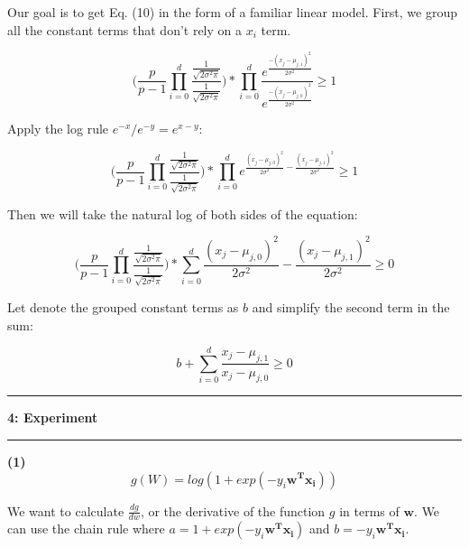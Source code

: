 \documentclass[11pt]{article}
\newcommand\question[2]{\vspace{.25in}\hrule\textbf{#1: #2}\vspace{.5em}\hrule\vspace{.10in}}
\renewcommand\part[1]{\vspace{.10in}\textbf{(#1)}}
\begin{document}
Our goal is to get Eq. (10) in the form of a familiar linear model. First, we group all the constant terms that don't rely on a $x_i$ term.

\begin{equation}
\Bigg( \frac{p}{p-1}\prod_{i = 0}^d \frac{\frac{1}{\sqrt{2\sigma^2\pi}}}{\frac{1}{\sqrt{2\sigma^2\pi}}} \Bigg) * \prod_{i = 0}^d \frac{e^{\frac{-(x_j-\mu_{j,1})^2}{2\sigma^2}}}{e^{\frac{-(x_j-\mu_{j,0})^2}{2\sigma^2}}} \geq 1
\end{equation}

Apply the log rule $e^{-x}/e^{-y} = e^{x-y}$:

\begin{equation}
\Bigg( \frac{p}{p-1}\prod_{i = 0}^d \frac{\frac{1}{\sqrt{2\sigma^2\pi}}}{\frac{1}{\sqrt{2\sigma^2\pi}}} \Bigg) * \prod_{i = 0}^d e^{\frac{(x_j-\mu_{j,0})^2}{2\sigma^2} - \frac{(x_j-\mu_{j,1})^2}{2\sigma^2}} \geq 1
\end{equation}

Then we will take the natural log of both sides of the equation:


\begin{equation}
\Bigg( \frac{p}{p-1}\prod_{i = 0}^d \frac{\frac{1}{\sqrt{2\sigma^2\pi}}}{\frac{1}{\sqrt{2\sigma^2\pi}}} \Bigg) * \sum_{i = 0}^d \frac{(x_j-\mu_{j,0})^2}{2\sigma^2} - \frac{(x_j-\mu_{j,1})^2}{2\sigma^2} \geq 0
\end{equation}

Let denote the grouped constant terms as $b$ and simplify the second term in the sum:

\begin{equation}
b + \sum_{i = 0}^d \frac{x_j - \mu_{j,1}}{x_j - \mu_{j,0}} \geq 0
\end{equation}

\question{4}{Experiment}

\part{1} 
$$g(W) = log(1 + exp(-y_i\mathbf{w^Tx_i}))$$

We want to calculate $\frac{dg}{dw}$, or the derivative of the function $g$ in terms of $\mathbf{w}$. We can use the chain rule where $a = 1 + exp(-y_i\mathbf{w^Tx_i})$ and $b = -y_i\mathbf{w^Tx_i}$.
\end{document}

